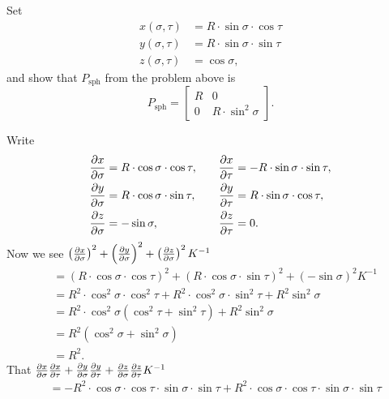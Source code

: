 \documentclass{ximera}
\begin{document}
\begin{problem}
  Set
  \begin{align*}
    x(\sigma,\tau) &=R\cdot \sin\sigma\cdot \cos \tau\\
    y(\sigma,\tau) &=R\cdot \sin\sigma\cdot \sin\tau\\
    z(\sigma,\tau) &=\cos \sigma,
  \end{align*}
  and show that $P_\mathrm{sph}$ from the problem above is
  \[
  P_\mathrm{sph} =
  \begin{bmatrix}
    R & 0 \\
    0 & R\cdot\sin^2 \sigma
  \end{bmatrix}.
  \]
  \begin{freeResponse}
    Write
    \[
    \begin{split}
      \pp[x]{\sigma} &= R\cdot \cos\sigma\cdot \cos \tau, \\
      \pp[y]{\sigma} &= R\cdot \cos\sigma\cdot \sin\tau,\\
      \pp[z]{\sigma} &= -\sin\sigma,
    \end{split}
    \qquad
    \begin{split}
      \pp[x]{\tau} &= -R\cdot \sin\sigma\cdot \sin \tau,\\
      \pp[y]{\tau} &= R\cdot \sin\sigma\cdot \cos\tau,\\
      \pp[z]{\tau} &= 0. 
    \end{split}
    \]
    Now we see $\left(\pp[x]{\sigma}\right)^2 + \left(\pp[y]{\sigma}\right)^2 + \left(\pp[z]{\sigma}\right)^2K^{-1}$
    \begin{align*}
      &= \left(R\cdot \cos\sigma\cdot \cos \tau \right)^2 + \left(R\cdot \cos\sigma\cdot \sin\tau\right)^2 + \left(-\sin\sigma\right)^2K^{-1}\\
      &= R^2\cdot \cos^2\sigma\cdot \cos^2 \tau + R^2\cdot \cos^2\sigma\cdot \sin^2\tau + R^2 \sin^2\sigma \\
      &= R^2\cdot \cos^2\sigma\left(\cos^2 \tau + \sin^2\tau\right) + R^2 \sin^2\sigma \\
      &= R^2\left(\cos^2\sigma + \sin^2\sigma\right) \\
      &= R^2.
    \end{align*}
    That $\pp[x]{\sigma}\pp[x]{\tau} + \pp[y]{\sigma}\pp[y]{\tau} + \pp[z]{\sigma}\pp[z]{\tau} K^{-1}$
    \begin{align*}
      &= -R^2\cdot \cos\sigma\cdot \cos \tau \cdot \sin\sigma\cdot \sin \tau + R^2\cdot \cos\sigma\cdot \cos \tau \cdot \sin\sigma\cdot \sin \tau\\

\end{align*}
\end{freeResponse}
\end{problem}
\end{document}
